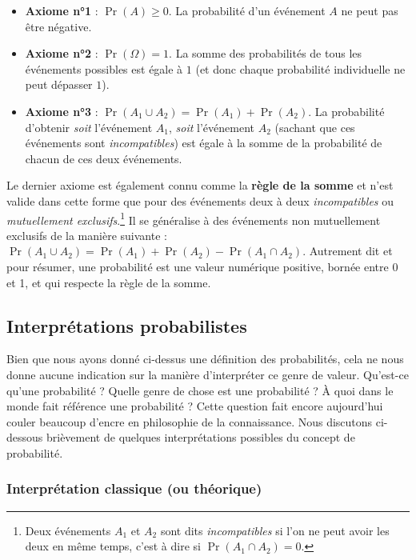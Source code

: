 \documentclass[
  a4paper,11pt,twoside,onecolumn,openright,final,oldfontcommands]{memoir}
\theoremstyle{definition}
\theoremstyle{definition}
\theoremstyle{definition}
\theoremstyle{remark}
\begin{document}
\begin{itemize}
\item
  \textbf{Axiome n°1} : \(\Pr(A) \geq 0\). La probabilité d'un événement \(A\) ne peut pas être négative.
\item
  \textbf{Axiome n°2} : \(\Pr(\Omega) = 1\). La somme des probabilités de tous les événements possibles est égale à \(1\) (et donc chaque probabilité individuelle ne peut dépasser \(1\)).
\item
  \textbf{Axiome n°3} : \(\Pr(A_{1} \cup A_{2}) = \Pr(A_{1}) + \Pr(A_{2})\). La probabilité d'obtenir \emph{soit} l'événement \(A_{1}\), \emph{soit} l'événement \(A_{2}\) (sachant que ces événements sont \emph{incompatibles}) est égale à la somme de la probabilité de chacun de ces deux événements.
\end{itemize}

Le dernier axiome est également connu comme la \textbf{règle de la somme} et n'est valide dans cette forme que pour des événements deux à deux \emph{incompatibles} ou \emph{mutuellement exclusifs}.\footnote{Deux événements \(A_{1}\) et \(A_{2}\) sont dits \emph{incompatibles} si l'on ne peut avoir les deux en même temps, c'est à dire si \(\Pr(A_{1} \cap A_{2}) = 0\).} Il se généralise à des événements non mutuellement exclusifs de la manière suivante : \(\Pr(A_{1} \cup A_{2}) = \Pr(A_{1}) + \Pr(A_{2}) - \Pr(A_{1} \cap A_{2})\). Autrement dit et pour résumer, une probabilité est une valeur numérique positive, bornée entre 0 et 1, et qui respecte la règle de la somme.

\hypertarget{interpruxe9tations-probabilistes}{%
\subsection{Interprétations probabilistes}\label{interpruxe9tations-probabilistes}}

Bien que nous ayons donné ci-dessus une définition des probabilités, cela ne nous donne aucune indication sur la manière d'interpréter ce genre de valeur. Qu'est-ce qu'une probabilité ? Quelle genre de chose est une probabilité ? À quoi dans le monde fait référence une probabilité ? Cette question fait encore aujourd'hui couler beaucoup d'encre en philosophie de la connaissance. Nous discutons ci-dessous brièvement de quelques interprétations possibles du concept de probabilité.

\hypertarget{interpruxe9tation-classique-ou-thuxe9orique}{%
\subsubsection{Interprétation classique (ou théorique)}\label{interpruxe9tation-classique-ou-thuxe9orique}}
\end{document}
